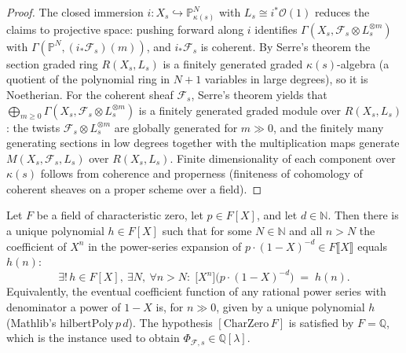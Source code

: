\begin{proof}
  The closed immersion \(i : X_s \hookrightarrow \mathbb{P}^N_{\kappa(s)}\)
  with \(L_s \cong i^* \mathcal{O}(1)\) reduces the claims to projective
  space: pushing forward along \(i\) identifies
  \(\Gamma(X_s, \mathcal{F}_s \otimes L_s^{\otimes m})\) with
  \(\Gamma(\mathbb{P}^N, (i_* \mathcal{F}_s)(m))\), and \(i_* \mathcal{F}_s\)
  is coherent. By Serre's theorem the section
  graded ring \(R(X_s, L_s)\) is a finitely generated graded
  \(\kappa(s)\)-algebra (a quotient of the polynomial ring in \(N+1\)
  variables in large degrees), so it is Noetherian. For the coherent sheaf
  \(\mathcal{F}_s\), Serre's theorem yields that
  \(\bigoplus_{m \ge 0} \Gamma(X_s, \mathcal{F}_s \otimes L_s^{\otimes m})\) is a
  finitely generated graded module over \(R(X_s, L_s)\): the twists
  \(\mathcal{F}_s \otimes L_s^{\otimes m}\) are globally generated for
  \(m \gg 0\), and the finitely many generating sections in low degrees together
  with the multiplication maps generate \(M(X_s, \mathcal{F}_s, L_s)\) over
  \(R(X_s, L_s)\). Finite dimensionality of each component over \(\kappa(s)\)
  follows from coherence and properness (finiteness of cohomology of coherent
  sheaves on a proper scheme over a field).
\end{proof}

\begin{lemma}
  \label{mk-lem:hilbertPoly_exists_mathlib}
  \mathlibok

  Let \(F\) be a field of characteristic zero, let \(p \in F[X]\), and let
  \(d \in \mathbb{N}\). Then there is a unique polynomial \(h \in F[X]\) such that
  for some \(N \in \mathbb{N}\) and all \(n > N\) the coefficient of \(X^n\) in the
  power-series expansion of \(p \cdot (1 - X)^{-d} \in F\llbracket X\rrbracket\)
  equals \(h(n)\):
  \[
    \exists!\, h \in F[X],\ \exists N,\ \forall n > N : \;
    \bigl[ X^n \bigr]\bigl( p \cdot (1-X)^{-d} \bigr) \;=\; h(n).
  \]
  Equivalently, the eventual coefficient function of any rational power series
  with denominator a power of \(1 - X\) is, for \(n \gg 0\), given by a unique
  polynomial \(h\) (Mathlib's \(\mathrm{hilbertPoly}\,p\,d\)). The hypothesis
  \([\mathrm{CharZero}\,F]\) is satisfied by \(F = \mathbb{Q}\), which is the
  instance used to obtain \(\Phi_{\mathcal{F},s} \in \mathbb{Q}[\lambda]\).
\end{lemma}


